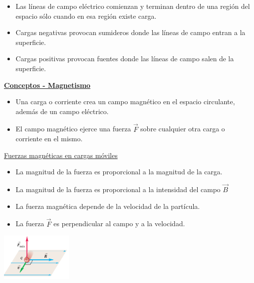 \documentclass[a4paper]{article}
\begin{document}
\begin{multicols}{2}
\begin{itemize}
                        \item Las líneas de campo eléctrico comienzan y terminan dentro de una región del espacio sólo cuando en esa región existe carga.
                        \item Cargas negativas provocan sumideros donde las líneas de campo entran a la superficie.
                        \item Cargas positivas provocan fuentes donde las líneas de campo salen de la superficie.
                    \end{itemize}
            \textbf{\underline{Conceptos - Magnetismo}}
                \begin{itemize}
                    \item Una carga o corriente crea un campo magnético en el espacio circulante, además de un campo eléctrico.
                    \item El campo magnético ejerce una fuerza $\vec{F}$ sobre cualquier otra carga o corriente en el mismo.
                \end{itemize}
                \underline{Fuerzas magnéticas en cargas móviles} \\[10pt]
                    \begin{itemize}
                        \item La magnitud de la fuerza es proporcional a la magnitud de la carga.
                        \item La magnitud de la fuerza es proporcional a la intensidad del campo $\vec{B}$
                        \item La fuerza magnética depende de la velocidad de la partícula.
                        \item La fuerza $\vec{F}$ es perpendicular al campo y a la velocidad.
                    \end{itemize}
                    \begin{center} \includegraphics[width=3.5cm]{../imagenes/ejesCampoMagnetico.png} \\ \end{center} 
                    

\end{multicols}
\end{document}
